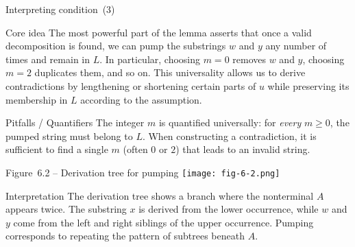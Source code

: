 \begin{frame}[t]{Interpreting condition (3)}
  \begin{tblock}{Core idea}
    The most powerful part of the lemma asserts that once a valid
    decomposition is found, we can pump the substrings $w$ and $y$ any
    number of times and remain in $L$.  In particular, choosing $m=0$
    removes $w$ and $y$, choosing $m=2$ duplicates them, and so on.
    This universality allows us to derive contradictions by
    lengthening or shortening certain parts of $u$ while preserving its
    membership in $L$ according to the assumption.
  \end{tblock}
  \begin{talert}{Pitfalls / Quantifiers}
    The integer $m$ is quantified universally: for \emph{every} $m \ge
    0$, the pumped string must belong to $L$.  When constructing a
    contradiction, it is sufficient to find a single $m$ (often $0$ or
    $2$) that leads to an invalid string.
  \end{talert}
  \label{fr:6.1-08}
\end{frame}

\begin{frame}[t]{Figure 6.2 – Derivation tree for pumping}
  \centering
  \texttt{[image: fig-6-2.png]}
  \begin{tblock}{Interpretation}
    The derivation tree shows a branch where the nonterminal $A$
    appears twice.  The substring $x$ is derived from the lower
    occurrence, while $w$ and $y$ come from the left and right siblings
    of the upper occurrence.  Pumping corresponds to repeating the
    pattern of subtrees beneath $A$.
  \end{tblock}
  \label{fr:6.1-09}
\end{frame}

